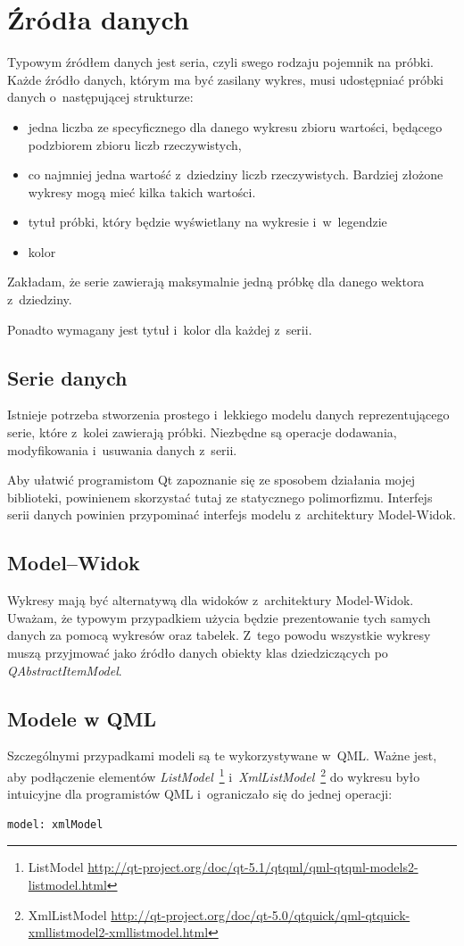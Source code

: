 \section{Źródła danych}
Typowym źródłem danych jest seria, czyli swego rodzaju pojemnik na próbki. Każde źródło danych, którym ma być zasilany wykres, musi udostępniać próbki danych o~następującej strukturze:

\begin{itemize}
\item{jedna liczba ze specyficznego dla danego wykresu zbioru wartości, będącego podzbiorem zbioru liczb rzeczywistych,}
\item{co najmniej jedna wartość z~dziedziny liczb rzeczywistych. Bardziej złożone wykresy mogą mieć kilka takich wartości.}
\item{tytuł próbki, który będzie wyświetlany na wykresie i~w~legendzie}
\item{kolor}
\end{itemize}

Zakładam, że serie zawierają maksymalnie jedną próbkę dla danego wektora z~dziedziny. 

Ponadto wymagany jest tytuł i~kolor dla każdej z~serii.


\subsection{Serie danych}
Istnieje potrzeba stworzenia prostego i~lekkiego modelu danych reprezentującego serie, które z~kolei zawierają próbki. Niezbędne są operacje dodawania, modyfikowania i~usuwania danych z~serii. 

Aby ułatwić programistom Qt zapoznanie się ze sposobem działania mojej biblioteki, powinienem skorzystać tutaj ze statycznego polimorfizmu. Interfejs serii danych powinien przypominać interfejs modelu z~architektury Model-Widok.

\subsection{Model--Widok}
Wykresy mają być alternatywą dla widoków z~architektury Model-Widok. Uważam, że typowym przypadkiem użycia będzie prezentowanie tych samych danych za pomocą wykresów oraz tabelek. Z~tego powodu wszystkie wykresy muszą przyjmować jako źródło danych obiekty klas dziedziczących po \textit{QAbstractItemModel}.

\subsection{Modele w QML}
Szczególnymi przypadkami modeli są te wykorzystywane w~QML. Ważne jest, aby podłączenie elementów \textit{ListModel}~\footnote{ListModel \url{http://qt-project.org/doc/qt-5.1/qtqml/qml-qtqml-models2-listmodel.html}} i~\textit{XmlListModel}~\footnote{XmlListModel \url{http://qt-project.org/doc/qt-5.0/qtquick/qml-qtquick-xmllistmodel2-xmllistmodel.html}} do wykresu było intuicyjne dla programistów QML i~ograniczało się do jednej operacji:
\begin{lstlisting}
model: xmlModel
\end{lstlisting}

